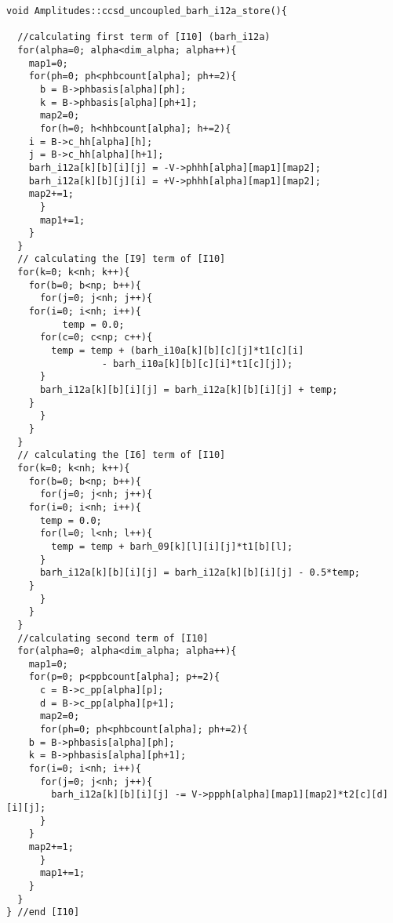 \begin{lstlisting}[label={list:impl:intermediate10},caption={implementation of I10 in the amp1 class function ccsd\_uncoupled\_barh\_i12a\_store}]
void Amplitudes::ccsd_uncoupled_barh_i12a_store(){
  
  //calculating first term of [I10] (barh_i12a)
  for(alpha=0; alpha<dim_alpha; alpha++){
    map1=0;
    for(ph=0; ph<phbcount[alpha]; ph+=2){
      b = B->phbasis[alpha][ph];
      k = B->phbasis[alpha][ph+1];
      map2=0;
      for(h=0; h<hhbcount[alpha]; h+=2){
	i = B->c_hh[alpha][h];
	j = B->c_hh[alpha][h+1];
	barh_i12a[k][b][i][j] = -V->phhh[alpha][map1][map2];
	barh_i12a[k][b][j][i] = +V->phhh[alpha][map1][map2];
	map2+=1;
      }
      map1+=1;
    }
  }
  // calculating the [I9] term of [I10]
  for(k=0; k<nh; k++){
    for(b=0; b<np; b++){
      for(j=0; j<nh; j++){
	for(i=0; i<nh; i++){
    	  temp = 0.0;
	  for(c=0; c<np; c++){
	    temp = temp + (barh_i10a[k][b][c][j]*t1[c][i] 
                 - barh_i10a[k][b][c][i]*t1[c][j]);
	  }
	  barh_i12a[k][b][i][j] = barh_i12a[k][b][i][j] + temp;
	}
      }
    }
  }
  // calculating the [I6] term of [I10]
  for(k=0; k<nh; k++){
    for(b=0; b<np; b++){
      for(j=0; j<nh; j++){
	for(i=0; i<nh; i++){	
	  temp = 0.0;
	  for(l=0; l<nh; l++){
	    temp = temp + barh_09[k][l][i][j]*t1[b][l];
	  }
	  barh_i12a[k][b][i][j] = barh_i12a[k][b][i][j] - 0.5*temp;
	}
      }
    }
  }
  //calculating second term of [I10]
  for(alpha=0; alpha<dim_alpha; alpha++){
    map1=0;
    for(p=0; p<ppbcount[alpha]; p+=2){
      c = B->c_pp[alpha][p];
      d = B->c_pp[alpha][p+1];
      map2=0;
      for(ph=0; ph<phbcount[alpha]; ph+=2){
	b = B->phbasis[alpha][ph];
	k = B->phbasis[alpha][ph+1];
	for(i=0; i<nh; i++){
	  for(j=0; j<nh; j++){
	    barh_i12a[k][b][i][j] -= V->ppph[alpha][map1][map2]*t2[c][d][i][j];
	  }
	}
	map2+=1;
      }
      map1+=1;
    }
  }
} //end [I10]
\end{lstlisting}

